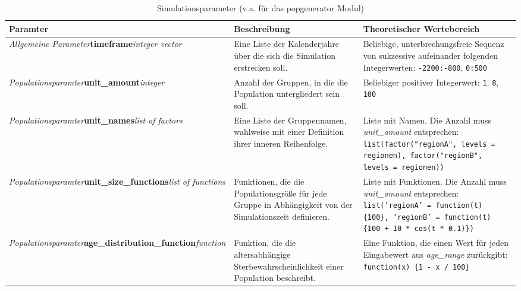 \documentclass[openany,twoside,twocolumn]{book}
\begin{document}
\begin{table*}[t]

\caption{\label{tab:param-popgenerator}Simulationsparameter (v.a. für das popgenerator Modul)}
\centering
\fontsize{8}{10}\selectfont
\begin{tabu} to 
\toprule
Paramter & Beschreibung & Theoretischer Wertebereich\\
\midrule
\textit{Allgemeine Parameter}\newline \textbf{timeframe}\newline \textit{integer vector} & Eine Liste der Kalenderjahre über die sich die Simulation erstrecken soll. & Beliebige, unterbrechungsfreie Sequenz von sukzessive aufeinander folgenden Integerwerten: \texttt{-2200:-800}, \texttt{0:500}\\
\addlinespace \hline \addlinespace
\textit{Populationsparamter}\newline \textbf{unit\_amount}\newline \textit{integer} & Anzahl der Gruppen, in die die Population untergliedert sein soll. & Beliebiger positiver Integerwert: \newline     \texttt{1}, \texttt{8}, \texttt{100}\\
\addlinespace \hline \addlinespace
\textit{Populationsparamter}\newline \textbf{unit\_names}\newline \textit{list of factors} & Eine Liste der Gruppennamen, wahlweise mit einer Definition ihrer inneren Reihenfolge. & Liste mit Namen. Die Anzahl muss \textit{unit\_amount} entsprechen: \newline     \texttt{list(factor("regionA", levels = regionen), factor("regionB", levels = regionen))}\\
\addlinespace \hline \addlinespace
\textit{Populationsparamter}\newline \textbf{unit\_size\_functions}\newline \textit{list of functions} & Funktionen, die die Populationsgröße für jede Gruppe in Abhängigkeit von der Simulationszeit definieren. & Liste mit Funktionen. Die Anzahl muss \textit{unit\_amount} entsprechen: \newline     \texttt{list('regionA' = function(t) \{100\}, 'regionB' = function(t) \{100 + 10 * cos(t * 0.1)\})}\\
\addlinespace \hline \addlinespace
\textit{Populationsparamter}\newline \textbf{age\_distribution\_function}\newline \textit{function} & Funktion, die die altersabhängige Sterbewahrscheinlichkeit einer Population beschreibt. & Eine Funktion, die einen Wert für jeden Eingabewert aus \textit{age\_range} zurückgibt: \newline     \texttt{function(x) \{1 - x / 100\}}\\

\end{tabu}
\end{table*}
\end{document}
